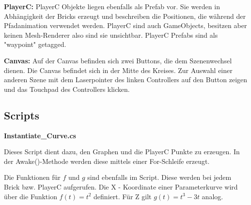 \textbf{PlayerC: } PlayerC Objekte liegen ebenfalls als Prefab vor. Sie werden in Abhängigkeit der Bricks erzeugt und beschreiben die Positionen, die während der Pfadanimation verwendet werden. PlayerC sind auch GameObjects, besitzen aber keinen Mesh-Renderer also sind sie unsichtbar. PlayerC Prefabs sind als "waypoint" getagged.

\textbf{Canvas: } Auf der Canvas befinden sich zwei Buttons, die dem Szenenwechsel dienen. Die Canvas befindet sich in der Mitte des Kreises. Zur Auswahl einer anderen Szene mit dem Laserpointer des linken Controllers auf den Button zeigen und das Touchpad des Controllers klicken. 

\subsection{Scripts}
\textbf{Instantiate\_Curve.cs}

Dieses Script dient dazu, den Graphen und die PlayerC Punkte zu erzeugen. In der Awake()-Methode werden diese mittels einer For-Schleife erzeugt. 

Die Funktionen für $f$ und $g$ sind ebenfalls im Script. Diese werden bei jedem Brick bzw. PlayerC aufgerufen. Die X - Koordinate einer Parameterkurve wird über die Funktion $ f(t) = t^{2} $ definiert. Für Z gilt $g(t) = t^{3} - 3t$ analog. 



